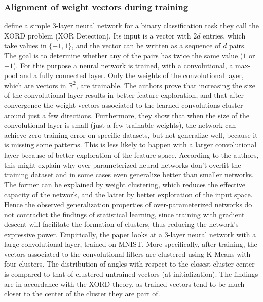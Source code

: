 \subsubsection*{Alignment of weight vectors during training}
\cite{brutzkus2019larger} define a simple 3-layer neural network for a binary classification task they call the XORD problem (XOR Detection). Its input is a vector with $2d$ entries, which take values in $\{-1, 1\}$, and the vector can be written as a sequence of $d$ pairs. The goal is to determine whether any of the pairs has twice the same value ($1$ or $-1$). For this purpose a neural network is trained, with a convolutional, a max-pool and a fully connected layer. Only the weights of the convolutional layer, which are vectors in $\mathbb{R}^2$, are trainable. The authors prove that increasing the size of the convolutional layer results in better feature exploration, and that after convergence the weight vectors associated to the learned convolutions cluster around just a few directions. Furthermore, they show that when the size of the convolutional layer is small (just a few trainable weights), the network can achieve zero-training error on specific datasets, but not generalize well, because it is missing some patterns. This is less likely to happen with a larger convolutional layer because of better exploration of the feature space. According to the authors, this might explain why over-parameterized neural networks don't overfit the training dataset and in some cases even generalize better than smaller networks. The former can be explained by weight clustering, which reduces the effective capacity of the network, and the latter by better exploration of the input space. Hence the observed generalization properties of over-parameterized networks do not contradict the findings of statistical learning, since training with gradient descent will facilitate the formation of clusters, thus reducing the network's expressive power. Empirically, the paper looks at a 3-layer neural network with a large convolutional layer, trained on MNIST. More specifically, after training, the vectors associated to the convolutional filters are clustered using K-Means with four clusters. The distribution of angles with respect to the closest cluster center is compared to that of clustered untrained vectors (at initialization). The findings are in accordance with the XORD theory, as trained vectors tend to be much closer to the center of the cluster they are part of.\\



